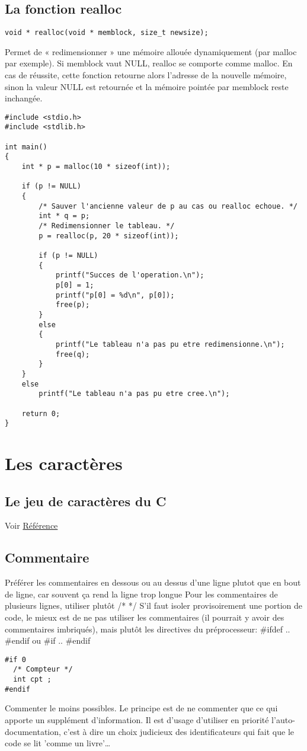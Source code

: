 \documentclass[a4paper]{article}
\begin{document}
\subsection{La fonction realloc}
\begin{lstlisting}
void * realloc(void * memblock, size_t newsize);
\end{lstlisting}
Permet de « redimensionner » une mémoire allouée dynamiquement (par malloc par exemple). Si memblock vaut NULL, realloc se comporte comme malloc. En cas de réussite, cette fonction retourne alors l'adresse de la nouvelle mémoire, sinon la valeur NULL est retournée et la mémoire pointée par memblock reste inchangée.
\begin{lstlisting}
#include <stdio.h>
#include <stdlib.h>

int main()
{
    int * p = malloc(10 * sizeof(int));
    
    if (p != NULL)
    {
        /* Sauver l'ancienne valeur de p au cas ou realloc echoue. */
        int * q = p;
        /* Redimensionner le tableau. */
        p = realloc(p, 20 * sizeof(int));
        
        if (p != NULL)
        {
            printf("Succes de l'operation.\n");
            p[0] = 1;
            printf("p[0] = %d\n", p[0]);
            free(p);
        }
        else
        {
            printf("Le tableau n'a pas pu etre redimensionne.\n");
            free(q);
        }
    }
    else
        printf("Le tableau n'a pas pu etre cree.\n");
    
    return 0;
}
\end{lstlisting}
\section{Les caractères}
\subsection{Le jeu de caractères du C}
Voir \href{http://emmanuel-delahaye.developpez.com/tutoriels/c/bonnes-pratiques-codage-c/#LI-A}{Référence}
\subsection{Commentaire}
Préférer les commentaires en dessous ou au dessus d'une ligne plutot que en bout de ligne, car souvent ça rend la ligne trop longue \newline
Pour les commentaires de plusieurs lignes, utiliser plutôt /* */\newline
S'il faut isoler provisoirement une portion de code, le mieux est de ne pas utiliser les commentaires (il pourrait y avoir des commentaires imbriqués), mais plutôt les directives du préprocesseur: \#ifdef .. \#endif ou \#if .. \#endif
\begin{lstlisting}
#if 0
  /* Compteur */
  int cpt ;
#endif  
\end{lstlisting}
Commenter le moins possibles. Le principe est de ne commenter que ce qui apporte un supplément d'information. Il est d'usage d'utiliser en priorité l'auto-documentation, c'est à dire un choix judicieux des identificateurs qui fait que le code se lit 'comme un livre'…
\end{document}
